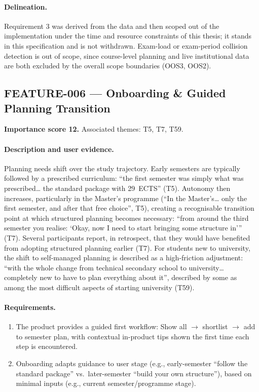 \paragraph{Delineation.}
Requirement 3 was derived from the data and then scoped out of the implementation under the time and resource constraints of this thesis; it stands in this specification and is not withdrawn. Exam-load or exam-period collision detection is out of scope, since course-level planning and live institutional data are both excluded by the overall scope boundaries (OOS3, OOS2).

\subsection{FEATURE-006 --- Onboarding \& Guided Planning Transition}
\label{feat:006}
\textbf{Importance score 12.} Associated themes: T5, T7, T59.

\paragraph{Description and user evidence.}
Planning needs shift over the study trajectory. Early semesters are typically followed by a prescribed curriculum: \enquote{the first semester was simply what was prescribed… the standard package with 29~ECTS} (T5). Autonomy then increases, particularly in the Master's programme (\enquote{In the Master's… only the first semester, and after that free choice}, T5), creating a recognisable transition point at which structured planning becomes necessary: \enquote{from around the third semester you realise: `Okay, now I need to start bringing some structure in'} (T7). Several participants report, in retrospect, that they would have benefited from adopting structured planning earlier (T7). For students new to university, the shift to self-managed planning is described as a high-friction adjustment: \enquote{with the whole change from technical secondary school to university… completely new to have to plan everything about it}, described by some as among the most difficult aspects of starting university (T59).

\paragraph{Requirements.}
\begin{enumerate}
    \item The product provides a guided first workflow: Show all $\to$ shortlist $\to$ add to semester plan, with contextual in-product tips shown the first time each step is encountered.
    \item Onboarding adapts guidance to user stage (e.g., early-semester \enquote{follow the standard package} vs.\ later-semester \enquote{build your own structure}), based on minimal inputs (e.g., current semester/programme stage).
\end{enumerate}


